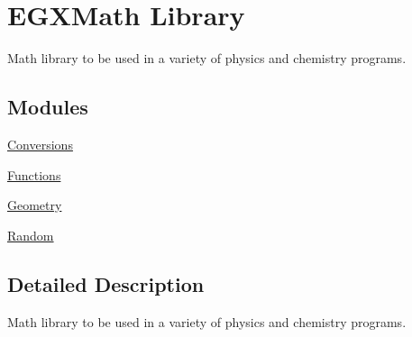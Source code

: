 \hypertarget{group___e_g_x_math}{}\section{E\+G\+X\+Math Library}
\label{group___e_g_x_math}


Math library to be used in a variety of physics and chemistry programs.  


\subsection*{Modules}
\begin{DoxyCompactItemize}
\item 
\mbox{\hyperlink{group___e_g_x_math-_conversions}{Conversions}}
\item 
\mbox{\hyperlink{group___e_g_x_math-_functions}{Functions}}
\item 
\mbox{\hyperlink{group___e_g_x_math-_geometry}{Geometry}}
\item 
\mbox{\hyperlink{group___e_g_x_math-_random}{Random}}
\end{DoxyCompactItemize}


\subsection{Detailed Description}
Math library to be used in a variety of physics and chemistry programs. 

